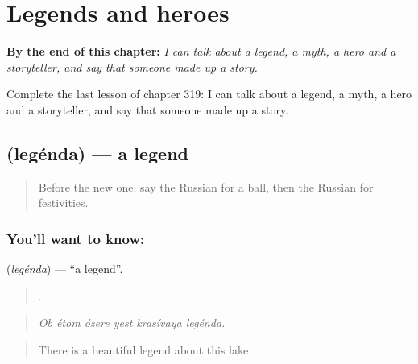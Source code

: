 
\chapter{Legends and heroes}
\label{ch:ru-legends-and-heroes}

\begin{chapteropening}
\textbf{By the end of this chapter:} \emph{I can talk about a legend, a myth, a hero and a storyteller, and say that someone made up a story.}

Complete the last lesson of chapter 319: I can talk about a legend, a myth, a hero and a storyteller, and say that someone made up a story.
\end{chapteropening}

\section[\texorpdfstring{\ru{легенда} (legénda)}{легенда (legénda)}]{ (legénda) — a legend}

\label{lesson:RU-C319-legenda}



\begin{quote}
Before the new one: say the Russian for a ball, then the Russian for festivities.
\end{quote}

\subsection*{You'll want to know: }
\textbf{} (\emph{legénda}) — \textquotedblleft{}a legend\textquotedblright{}.

\begin{quote}
     .
\end{quote}

\begin{quote}
\emph{Ob étom ózere yest krasívaya legénda.}
\end{quote}

\begin{quote}
There is a beautiful legend about this lake.
\end{quote}

